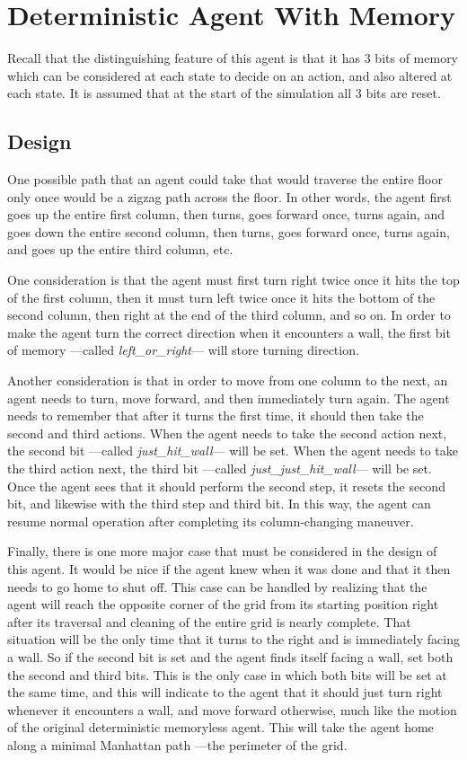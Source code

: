 \documentclass[10 pt.]{article}
\begin{document}
\section{Deterministic Agent With Memory}
Recall that the distinguishing feature of this agent is that it has 3 bits of memory which can be considered at each
state to decide on an action, and also altered at each state. It is assumed that at the start of the simulation all
3 bits are reset.
\subsection{Design}
One possible path that an agent could take that would traverse the entire floor only once would be a zigzag path
across the floor. In other words, the agent first goes up the entire first column, then turns, goes forward once, turns
again, and goes down the entire second column, then turns, goes forward once, turns again, and goes up the entire third
column, etc.

One consideration is that the agent must first turn right twice once it hits the top of the first
column, then it must turn left twice once it hits the bottom of the second column, then right at the end of the third
column, and so on. In order to make the agent turn the correct direction when it encounters a wall, the first bit of
memory ---called \emph{left\_or\_right}--- will store turning direction.

Another consideration is that in order to move from one column to the next, an agent needs to turn, move forward, and
then immediately turn again. The agent needs to remember that after it turns the first time, it should then take the
second and third actions. When the agent needs to take the second action next, the second bit ---called
\emph{just\_hit\_wall}--- will be set. When the agent needs to take the third action next, the third bit ---called
\emph{just\_just\_hit\_wall}--- will be set. Once the agent sees that it should perform the second step, it resets the
second bit, and likewise with the third step and third bit. In this way, the agent can resume normal operation after
completing its column-changing maneuver.

Finally, there is one more major case that must be considered in the design of this agent. It would be nice if the agent knew
when it was done and that it then needs to go home to shut off. This case can be handled by realizing that the agent will reach
the opposite corner of the grid from its starting position right after its traversal and cleaning of the entire grid is nearly complete.
That situation will be the only time that it turns to the right and is immediately facing a wall. So if the second bit is set
and the agent finds itself facing a wall, set both the second and third bits. This is the only case in which both bits will
be set at the same time, and this will indicate to the agent that it should just turn right whenever it encounters a wall,
and move forward otherwise, much like the motion of the original deterministic memoryless agent. This will take the agent home
along a minimal Manhattan path ---the perimeter of the grid.
\end{document}
